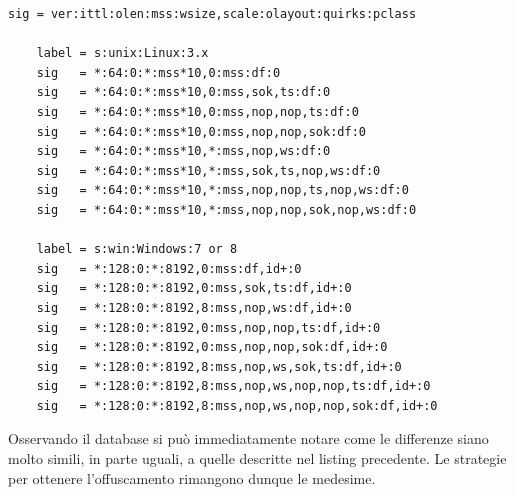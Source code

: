 \begin{lstlisting}[caption={Database fingerprinting per pacchetti SYN+ACK dell'handshake TCP}]	
	sig = ver:ittl:olen:mss:wsize,scale:olayout:quirks:pclass

	label = s:unix:Linux:3.x
	sig   = *:64:0:*:mss*10,0:mss:df:0
	sig   = *:64:0:*:mss*10,0:mss,sok,ts:df:0
	sig   = *:64:0:*:mss*10,0:mss,nop,nop,ts:df:0
	sig   = *:64:0:*:mss*10,0:mss,nop,nop,sok:df:0
	sig   = *:64:0:*:mss*10,*:mss,nop,ws:df:0
	sig   = *:64:0:*:mss*10,*:mss,sok,ts,nop,ws:df:0
	sig   = *:64:0:*:mss*10,*:mss,nop,nop,ts,nop,ws:df:0
	sig   = *:64:0:*:mss*10,*:mss,nop,nop,sok,nop,ws:df:0
	
	label = s:win:Windows:7 or 8
	sig   = *:128:0:*:8192,0:mss:df,id+:0
	sig   = *:128:0:*:8192,0:mss,sok,ts:df,id+:0
	sig   = *:128:0:*:8192,8:mss,nop,ws:df,id+:0
	sig   = *:128:0:*:8192,0:mss,nop,nop,ts:df,id+:0
	sig   = *:128:0:*:8192,0:mss,nop,nop,sok:df,id+:0
	sig   = *:128:0:*:8192,8:mss,nop,ws,sok,ts:df,id+:0
	sig   = *:128:0:*:8192,8:mss,nop,ws,nop,nop,ts:df,id+:0
	sig   = *:128:0:*:8192,8:mss,nop,ws,nop,nop,sok:df,id+:0
\end{lstlisting}

Osservando il database si può immediatamente notare come le differenze siano molto simili, in parte uguali, a quelle descritte nel listing precedente.
Le strategie per ottenere l'offuscamento rimangono dunque le medesime.







